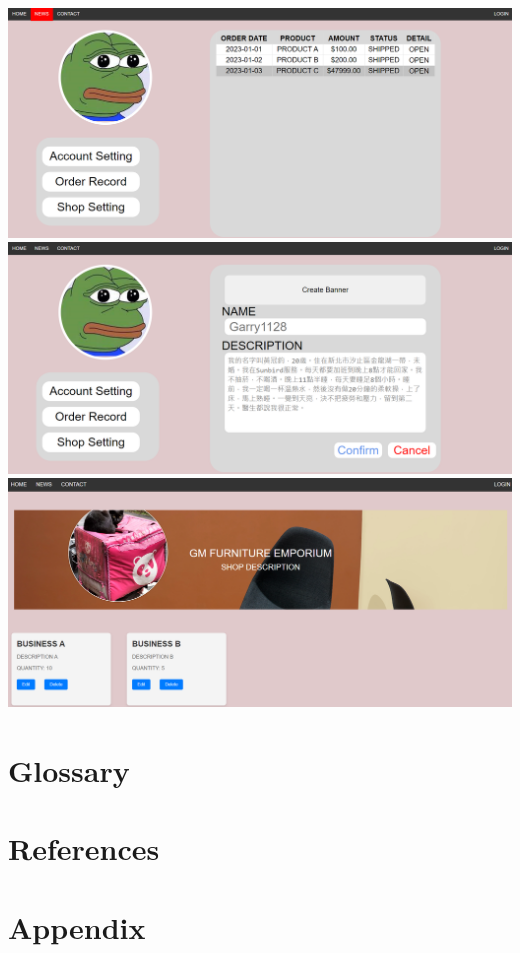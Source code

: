 \documentclass[a4paper, 12pt]{article}
\begin{document}
\begin{center}
\includegraphics[scale=0.4]{ui/AccountSettingPage2.png}
\includegraphics[scale=0.4]{ui/AccountSettingPage3.png}
\includegraphics[scale=0.4]{ui/ShopManagerPage.png}
\end{center}
\newpage
\section{Glossary}
\newpage

\section{References}
\newpage

\section{Appendix}
\newpage
\end{document}
